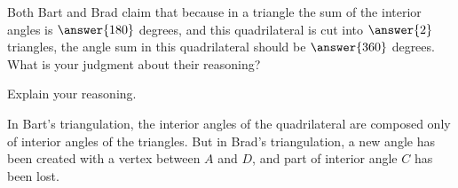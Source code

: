 \documentclass[nooutcomes]{ximera}
\begin{document}
\begin{problem}

Both Bart and Brad claim that because in a triangle the sum of the interior angles is $\answer{180}$ degrees, and this quadrilateral is cut into $\answer{2}$ triangles, the angle sum in this quadrilateral should be $\answer{360}$ degrees.  
What is your judgment about their reasoning?   
\begin{multipleChoice}
\end{multipleChoice}

Explain your reasoning.
\begin{freeResponse}
\begin{hint}
In Bart's triangulation, the interior angles of the quadrilateral are composed only of interior angles of the triangles.  But in Brad's triangulation, a new angle has been created with a vertex between $A$ and $D$, and part of interior angle $C$ has been lost.  
\end{hint}
\end{freeResponse}
\end{problem}
\end{document}
